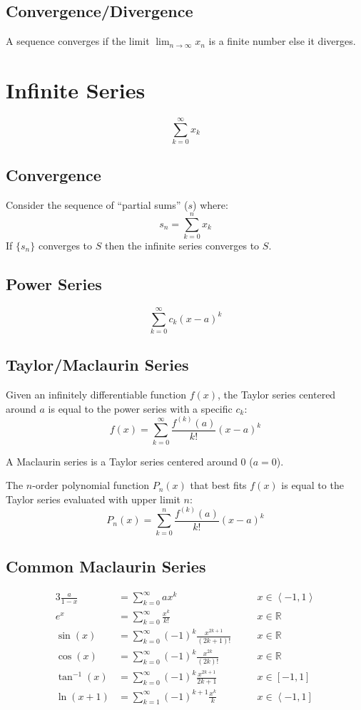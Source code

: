 \documentclass[12pt]{article}
\newcommand*{\R}{\mathbb{R}}
\newcommand*{\atan}{\tan^{-1}}
\newcommand*{\isum}[1]{\sum\limits_{#1}^\infty}
\newcommand*{\fixmath}{%
  \makebox{}\vspace{\glueexpr-\baselineskip-\abovedisplayskip}}
\newenvironment{fixskip}{\setlength{\abovedisplayskip}{0pt}%
  \setlength{\belowdisplayskip}{0pt}\fixmath\ignorespaces}%
  {\ignorespacesafterend}
\begin{document}
\subsection*{Convergence\slash Divergence}
A sequence converges if the limit \(\displaystyle\lim_{n \to \infty} x_n\) is
a finite number else it diverges.
\section*{Infinite Series}
\begin{fixskip}
  \[
    \isum{k=0} x_k
  \]
\end{fixskip}
\subsection*{Convergence}
Consider the sequence of ``partial sums'' (\(s\)) where:
\[
  s_n = \sum_{k=0}^n x_k
\]
If \(\{s_n\}\) converges to \(S\) then the infinite series converges to \(S\).
\subsection*{Power Series}
\begin{fixskip}
  \[
    \isum{k=0} c_k{(x-a)}^k
  \]
\end{fixskip}
\subsection*{Taylor\slash Maclaurin Series}
Given an infinitely differentiable function \(f(x)\), the Taylor series
centered around \(a\) is equal to the power series with a specific \(c_k\):
\[
  f(x) = \isum{k=0} \frac{f^{(k)}(a)}{k!}{(x-a)}^k
\]

A Maclaurin series is a Taylor series centered around 0 (\(a = 0\)).

The \(n\)-order polynomial function \(P_n(x)\) that best fits \(f(x)\) is
equal to the Taylor series evaluated with upper limit \(n\):
\[
  P_n(x) = \sum_{k=0}^{n} \frac{f^{(k)}(a)}{k!}{(x-a)}^k
\]
\subsection*{Common Maclaurin Series}
\begin{fixskip}
  \begin{alignat*}{3}
    \frac{a}{1-x} &= \isum{k=0} ax^k &&\quad x \in \left<-1,1\right>\\
    e^x &= \isum{k=0} \frac{x^k}{k!} &&\quad x \in \R\\
    \sin(x) &= \isum{k=0} {(-1)}^k \frac{x^{2k+1}}{(2k+1)!} &&\quad x \in \R\\
    \cos(x) &= \isum{k=0} {(-1)}^k \frac{x^{2k}}{(2k)!} &&\quad x \in \R\\
    \atan(x) &= \isum{k=0} {(-1)}^k \frac{x^{2k+1}}{2k+1} &&\quad x \in [-1,1]\\
    \ln(x+1) &= \isum{k=1} {(-1)}^{k+1} \frac{x^k}{k} &&\quad x \in
      \left<-1,1\right]
  \end{alignat*}
\end{fixskip}
\end{document}
